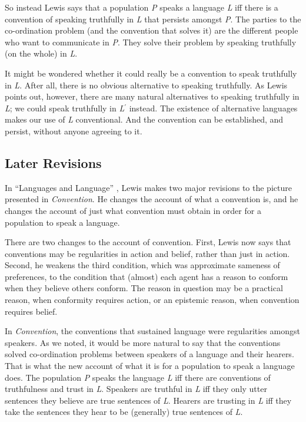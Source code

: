 So instead Lewis says that a population \textit{P} speaks a language \textit{L} iff there is a convention of speaking truthfully in \textit{L} that persists amongst \textit{P}. The parties to the co-ordination problem (and the convention that solves it) are the different people who want to communicate in \textit{P}. They solve their problem by speaking truthfully (on the whole) in \textit{L}.

It might be wondered whether it could really be a convention to speak truthfully in \textit{L}. After all, there is no obvious alternative to speaking truthfully. As Lewis points out, however, there are many natural alternatives to speaking truthfully in \textit{L}; we could speak truthfully in \textit{L}\(^\prime\) instead. The existence of alternative languages makes our use of \textit{L} conventional. And the convention can be established, and persist, without anyone agreeing to it.

\subsection{Later Revisions}
In ``Languages and Language'' \citeyearpar{Lewis1975b}, Lewis makes two major revisions to the picture presented in \textit{Convention}. He changes the account of what a convention is, and he changes the account of just what convention must obtain in order for a population to speak a language.

There are two changes to the account of convention. First, Lewis now says that conventions may be regularities in action and belief, rather than just in action. Second, he weakens the third condition, which was approximate sameness of preferences, to the condition that (almost) each agent has a reason to conform when they believe others conform. The reason in question may be a practical reason, when conformity requires action, or an epistemic reason, when convention requires belief.

In \textit{Convention}, the conventions that sustained language were regularities amongst speakers. As we noted, it would be more natural to say that the conventions solved co-ordination problems between speakers of a language and their hearers. That is what the new account of what it is for a population to speak a language does. The population \textit{P} speaks the language \textit{L }iff there are conventions of truthfulness and trust in \textit{L}. Speakers are truthful in \textit{L} iff they only utter sentences they believe are true sentences of \textit{L}. Hearers are trusting in \textit{L} iff they take the sentences they hear to be (generally) true sentences of \textit{L}.

